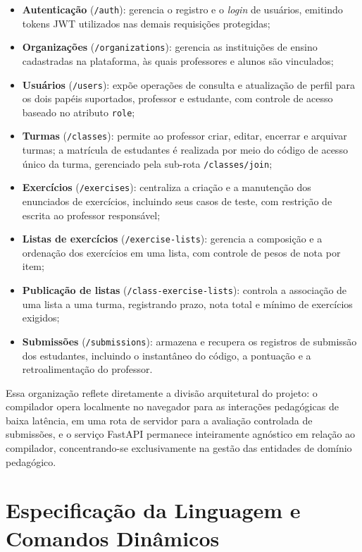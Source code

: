 \begin{itemize}
    \item \textbf{Autenticação} (\texttt{/auth}): gerencia o registro e o \textit{login} de usuários, emitindo tokens JWT utilizados nas demais requisições protegidas;
    \item \textbf{Organizações} (\texttt{/organizations}): gerencia as instituições de ensino cadastradas na plataforma, às quais professores e alunos são vinculados;
    \item \textbf{Usuários} (\texttt{/users}): expõe operações de consulta e atualização de perfil para os dois papéis suportados, professor e estudante, com controle de acesso baseado no atributo \texttt{role};
    \item \textbf{Turmas} (\texttt{/classes}): permite ao professor criar, editar, encerrar e arquivar turmas; a matrícula de estudantes é realizada por meio do código de acesso único da turma, gerenciado pela sub-rota \texttt{/classes/join};
    \item \textbf{Exercícios} (\texttt{/exercises}): centraliza a criação e a manutenção dos enunciados de exercícios, incluindo seus casos de teste, com restrição de escrita ao professor responsável;
    \item \textbf{Listas de exercícios} (\texttt{/exercise-lists}): gerencia a composição e a ordenação dos exercícios em uma lista, com controle de pesos de nota por item;
    \item \textbf{Publicação de listas} (\texttt{/class-exercise-lists}): controla a associação de uma lista a uma turma, registrando prazo, nota total e mínimo de exercícios exigidos;
    \item \textbf{Submissões} (\texttt{/submissions}): armazena e recupera os registros de submissão dos estudantes, incluindo o instantâneo do código, a pontuação e a retroalimentação do professor.
\end{itemize}

Essa organização reflete diretamente a divisão arquitetural do projeto: o compilador opera localmente no navegador para as interações pedagógicas de baixa latência, em uma rota de servidor para a avaliação controlada de submissões, e o serviço FastAPI permanece inteiramente agnóstico em relação ao compilador, concentrando-se exclusivamente na gestão das entidades de domínio pedagógico.

\section{Especificação da Linguagem e Comandos Dinâmicos}
\label{sec:especificacao-linguagem}

